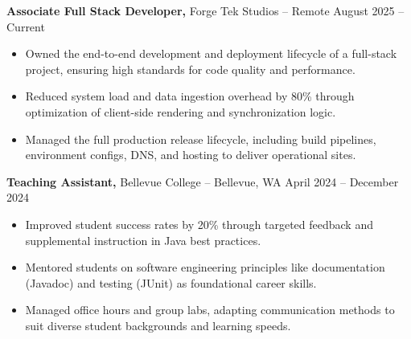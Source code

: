\documentclass[11pt]{article}       %
\begin{document}
\textbf{Associate Full Stack Developer,} {Forge Tek Studios} -- Remote \hfill August 2025 -- Current 
\vspace{-9pt}
\begin{itemize}
  \item Owned the end-to-end development and deployment lifecycle of a full-stack project, ensuring high standards for code quality and performance.
  \item Reduced system load and data ingestion overhead by 80\% through optimization of client-side rendering and synchronization logic.
  \item Managed the full production release lifecycle, including build pipelines, environment configs, DNS, and hosting to deliver operational sites.
\end{itemize}

\textbf{Teaching Assistant,} {Bellevue College} -- Bellevue, WA \hfill April 2024 -- December 2024 \\
\vspace{-9pt}
\begin{itemize}
  \item Improved student success rates by 20\% through targeted feedback and supplemental instruction in Java best practices.
  \item Mentored students on software engineering principles like documentation (Javadoc) and testing (JUnit) as foundational career skills.
  \item Managed office hours and group labs, adapting communication methods to suit diverse student backgrounds and learning speeds.
\end{itemize}
\end{document}
